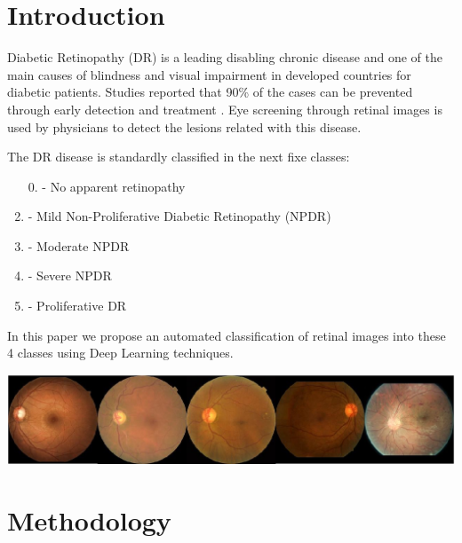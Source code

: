 \documentclass[a0,portrait]{a0poster}
\begin{document}
\begin{multicols}{3}
\section*{Introduction}

Diabetic Retinopathy (DR) is a leading disabling chronic disease  and  one of the main causes of blindness and visual impairment in developed countries for diabetic patients. Studies reported that 90\% of the cases can be prevented through early detection and treatment \cite{torrents15}. Eye screening through retinal images is used by physicians to detect the lesions related with this disease. 

The DR disease is standardly classified \cite{diaclass} in the next fixe classes:

\begin{enumerate}
	\item [0.]\setcounter{enumi}{0} - No apparent retinopathy
	\item - Mild Non-Proliferative Diabetic Retinopathy (NPDR)
	\item - Moderate NPDR
	\item - Severe NPDR
	\item - Proliferative DR
\end{enumerate}

In this paper we propose an automated classification of retinal images into these 4 classes using Deep Learning techniques. 

\begin{center}
	\includegraphics[width=20cm]{5classes.eps}
	\label{image-classes}
\end{center}


\color{DarkSlateGray} %


\section*{Methodology}


\end{multicols}
\end{document}

